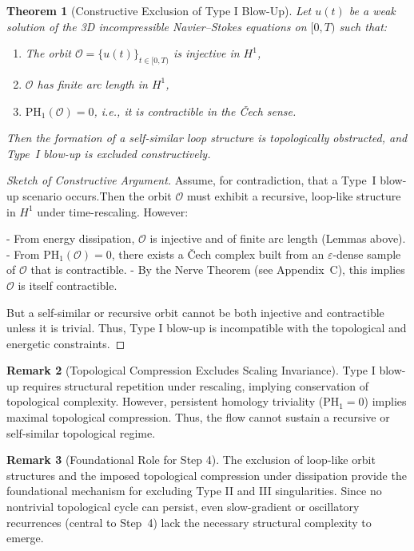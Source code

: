 \documentclass[11pt]{article}
\newtheorem{theorem}{Theorem}[section]
\theoremstyle{definition}
\newtheorem{remark}[theorem]{Remark}
\begin{document}
\begin{theorem}[Constructive Exclusion of Type I Blow-Up]
Let $u(t)$ be a weak solution of the 3D incompressible Navier–Stokes equations on $[0,T)$ such that:
\begin{enumerate}
    \item The orbit $\mathcal{O} = \{u(t)\}_{t \in [0,T)}$ is injective in $H^1$,
    \item $\mathcal{O}$ has finite arc length in $H^1$,
    \item $\mathrm{PH}_1(\mathcal{O}) = 0$, i.e., it is contractible in the Čech sense.
\end{enumerate}
Then the formation of a self-similar loop structure is topologically obstructed, and Type~I blow-up is excluded constructively.
\end{theorem}

\begin{proof}[Sketch of Constructive Argument]
Assume, for contradiction, that a Type~I blow-up scenario occurs.Then the orbit $\mathcal{O}$ must exhibit a recursive, loop-like structure in $H^1$ under time-rescaling. However:

- From energy dissipation, $\mathcal{O}$ is injective and of finite arc length (Lemmas above).
- From $\mathrm{PH}_1(\mathcal{O}) = 0$, there exists a Čech complex built from an $\varepsilon$-dense sample of $\mathcal{O}$ that is contractible.
- By the Nerve Theorem (see Appendix~C), this implies $\mathcal{O}$ is itself contractible.

But a self-similar or recursive orbit cannot be both injective and contractible unless it is trivial. Thus, Type I blow-up is incompatible with the topological and energetic constraints.
\end{proof}

\begin{remark}[Topological Compression Excludes Scaling Invariance]
Type I blow-up requires structural repetition under rescaling, implying conservation of topological complexity. However, persistent homology triviality ($\mathrm{PH}_1 = 0$) implies maximal topological compression. Thus, the flow cannot sustain a recursive or self-similar topological regime.
\end{remark}

\begin{remark}[Foundational Role for Step 4]
The exclusion of loop-like orbit structures and the imposed topological compression under dissipation provide the foundational mechanism for excluding Type II and III singularities. Since no nontrivial topological cycle can persist, even slow-gradient or oscillatory recurrences (central to Step~4) lack the necessary structural complexity to emerge.
\end{remark}
        
\end{document}
